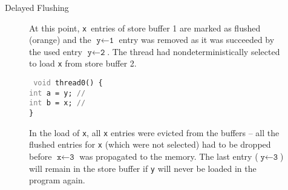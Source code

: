 \documentclass[final, 20pt, a0]{beamer}
\newlength{\twocolwid}
\begin{document}
\begin{frame}[t]
\begin{columns}[t]
\begin{column}{\twocolwid}
\begin{block}{Delayed Flushing}
\begin{figure}[h]
\begin{minipage}[t]{\colwidth}
\caption{At this point, \texttt{x}~entries of store buffer 1 are marked as flushed (\textcolor{flushed}{orange}) and the \mbox{$\texttt{y} \leftarrow \texttt{1}$} entry was removed as it was succeeded by the used entry \mbox{$\texttt{y} \leftarrow \texttt{2}$}.
The thread had nondeterministically selected to load \texttt{x} from store buffer 2.}

\label{fig:flushflagB}

\end{minipage}
%
\hfill
%
\begin{minipage}[t]{\colwidth}


\begingroup
    \tt
    \textcolor{gray}{void} thread0() \{ \\
    \indent{}\textcolor{gray}{int} a = y; \textcolor{gray}{// } \\
    \indent{}\textcolor{gray}{int} b = x; \textcolor{gray}{// } \\
    \}
\endgroup

\caption{
In the load of \texttt{x}, all \texttt{x} entries were evicted from the buffers -- all the flushed entries for \texttt{x} (which were not selected) had to be dropped before \mbox{$\texttt{x} \leftarrow \texttt{3}$} was propagated to the memory.
The last entry (\mbox{$\texttt{y} \leftarrow \texttt{3}$}) will remain in the store buffer if \texttt{y} will never be loaded in the program again.
}

\label{fig:flushflagC}

\end{minipage}
\end{figure}


\end{block}
\end{column}
\end{columns}
\end{frame}
\end{document}
